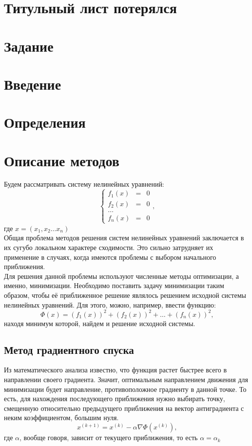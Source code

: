 \documentclass[a4paper, 12pt]{article}
\begin{document}
\section*{Титульный лист потерялся}
\newpage
\section*{Задание}
\newpage
\tableofcontents
\newpage
\section*{Введение}
\newpage
\section*{Определения}
\newpage
\section*{Описание методов}
Будем рассматривать систему нелинейных уравнений:
\[
\left\{
\begin{array}{ccc}	f_1(x) & = &  0\\
	f_2(x) & = &  0\\
	\ldots \\
	f_n(x) & = &  0 
\end{array}
\text{,}
\right.
\]
где $x = (x_1, x_2 \ldots x_n)$\\
Общая проблема методов решения систем нелинейных уравнений заключается в их сугубо локальном
характере сходимости. Это сильно затрудняет их применение в случаях, когда имеются проблемы с 
выбором начального приближения.\\
Для решения данной проблемы используют численные методы оптимизации, а именно, минимизации.
Необходимо поставить задачу минимизации таким образом, чтобы её приближенное решение являлось решением 
исходной системы нелинейных уравнений. Для этого, можно, например, ввести функцию:
\begin{equation*}
	\Phi(x) = (f_1(x))^2 + (f_2(x))^2 + \ldots + (f_n(x))^2 \text{,}
\end{equation*}
находя минимум которой, найдем и решение исходной системы. 

\subsection*{Метод градиентного спуска}
Из математического анализа известно, что функция растет быстрее всего в направлении
своего градиента. Значит, оптимальным направлением движения для минимизации будет направление, 
противоположное градиенту в данной точке. То есть, 
для нахождения последующего приближения нужно выбирать точку, смещенную относительно предыдущего
приближения на вектор антиградиента с неким коэффициентом, большим нуля.
\begin{equation}
	x^{(k+1)} = x^{(k)} - \alpha \nabla \Phi(x^{(k)}) \text{,}
\end{equation}
где $\alpha$, вообще говоря, зависит от текущего приближения, то есть $\alpha = \alpha_k$
\end{document}
